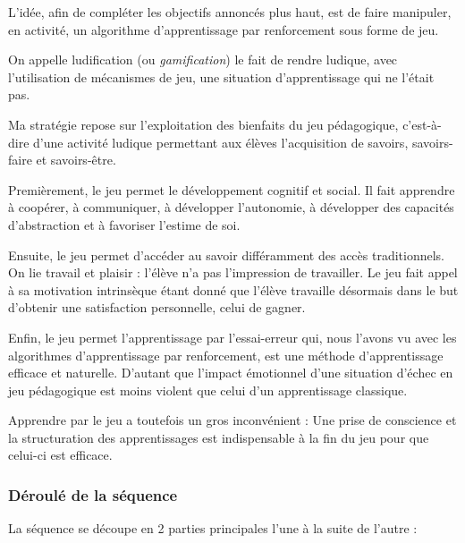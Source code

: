 \documentclass[
12pt,
french,
]{article}
\begin{document}
L'idée, afin de compléter les objectifs annoncés plus haut, est de faire
manipuler, en activité, un algorithme d'apprentissage par renforcement
sous forme de jeu.

On appelle ludification (ou \emph{gamification}) le fait de rendre
ludique, avec l'utilisation de mécanismes de jeu, une situation
d'apprentissage qui ne l'était pas.

Ma stratégie repose sur l'exploitation des bienfaits du jeu pédagogique,
c'est-à-dire d'une activité ludique permettant aux élèves l'acquisition
de savoirs, savoirs-faire et savoirs-être.

Premièrement, le jeu permet le développement cognitif et social. Il fait
apprendre à coopérer, à communiquer, à développer l'autonomie, à
développer des capacités d'abstraction et à favoriser l'estime de soi.

Ensuite, le jeu permet d'accéder au savoir différamment des accès
traditionnels. On lie travail et plaisir : l'élève n'a pas l'impression
de travailler. Le jeu fait appel à sa motivation intrinsèque étant donné
que l'élève travaille désormais dans le but d'obtenir une satisfaction
personnelle, celui de gagner.

Enfin, le jeu permet l'apprentissage par l'essai-erreur qui, nous
l'avons vu avec les algorithmes d'apprentissage par renforcement, est
une méthode d'apprentissage efficace et naturelle. D'autant que l'impact
émotionnel d'une situation d'échec en jeu pédagogique est moins violent
que celui d'un apprentissage classique.

Apprendre par le jeu a toutefois un gros inconvénient : Une prise de
conscience et la structuration des apprentissages est indispensable à la
fin du jeu pour que celui-ci est efficace.

\hypertarget{duxe9rouluxe9-de-la-suxe9quence}{%
\subsubsection{Déroulé de la
séquence}\label{duxe9rouluxe9-de-la-suxe9quence}}

La séquence se découpe en 2 parties principales l'une à la suite de
l'autre :
\end{document}
